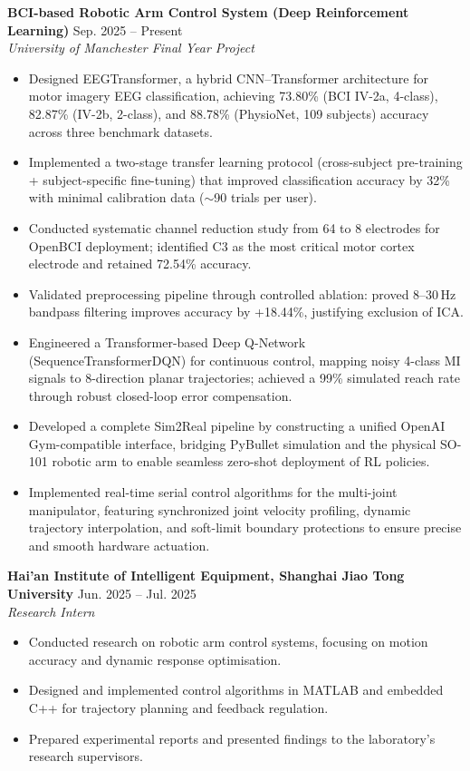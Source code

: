 \documentclass[11pt, a4paper]{article}
\newcommand{\entry}[2]{\textbf{#1} \hfill #2}
\begin{document}
\entry{BCI-based Robotic Arm Control System (Deep Reinforcement Learning)}{Sep. 2025 -- Present} \\
\textit{University of Manchester Final Year Project}
\begin{itemize}[leftmargin=*, nosep, topsep=2pt]
    \item Designed EEGTransformer, a hybrid CNN--Transformer architecture for motor imagery EEG classification, achieving 73.80\% (BCI IV-2a, 4-class), 82.87\% (IV-2b, 2-class), and 88.78\% (PhysioNet, 109 subjects) accuracy across three benchmark datasets.
    \item Implemented a two-stage transfer learning protocol (cross-subject pre-training + subject-specific fine-tuning) that improved classification accuracy by 32\% with minimal calibration data ($\sim$90 trials per user).
    \item Conducted systematic channel reduction study from 64 to 8 electrodes for OpenBCI deployment; identified C3 as the most critical motor cortex electrode and retained 72.54\% accuracy.
    \item Validated preprocessing pipeline through controlled ablation: proved 8--30\,Hz bandpass filtering improves accuracy by +18.44\%, justifying exclusion of ICA.
    \item Engineered a Transformer-based Deep Q-Network (SequenceTransformerDQN) for continuous control, mapping noisy 4-class MI signals to 8-direction planar trajectories; achieved a 99\% simulated reach rate through robust closed-loop error compensation.
    \item Developed a complete Sim2Real pipeline by constructing a unified OpenAI Gym-compatible interface, bridging PyBullet simulation and the physical SO-101 robotic arm to enable seamless zero-shot deployment of RL policies.
    \item Implemented real-time serial control algorithms for the multi-joint manipulator, featuring synchronized joint velocity profiling, dynamic trajectory interpolation, and soft-limit boundary protections to ensure precise and smooth hardware actuation.
\end{itemize}

\vspace{4pt}
\entry{Hai'an Institute of Intelligent Equipment, Shanghai Jiao Tong University}{Jun. 2025 -- Jul. 2025} \\
\textit{Research Intern}
\begin{itemize}[leftmargin=*, nosep, topsep=2pt]
    \item Conducted research on robotic arm control systems, focusing on motion accuracy and dynamic response optimisation.
    \item Designed and implemented control algorithms in MATLAB and embedded C++ for trajectory planning and feedback regulation.
    \item Prepared experimental reports and presented findings to the laboratory's research supervisors.
\end{itemize}
\end{document}
